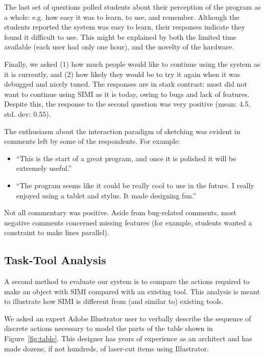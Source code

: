\documentclass{article}
\begin{document}
The last set of questions polled students about their perception of
the program as a whole: e.g. how easy it was to learn, to use, and
remember. Although the students reported the system was easy to learn,
their responses indicate they found it difficult to use. This might be
explained by both the limited time available (each user had only one
hour), and the novelty of the hardware.

Finally, we asked (1) how much people would like to continue using the
system as it is currently, and (2) how likely they would be to try it
again when it was debugged and nicely tuned. The responses are in
stark contrast: most did not want to continue using SIMI as it is
today, owing to bugs and lack of features. Despite this, the response
to the second question was very positive (mean: 4.5, std. dev: 0.55).

The enthusiasm about the interaction paradigm of sketching was evident
in comments left by some of the respondents. For example:

\begin{itemize}
\item ``This is the start of a great program, and once it is polished it
  will be extremely useful.''
\item ``The program seems like it could be really cool to use in the
  future. I really enjoyed using a tablet and stylus. It made
  designing fun.''
\end{itemize}

Not all commentary was positive. Aside from bug-related comments, most
negative comments concerned missing features (for example, students
wanted a constraint to make lines parallel).

\subsection{Task-Tool Analysis}

A second method to evaluate our system is to compare the actions
required to make an object with SIMI compared with an existing
tool. This analysis is meant to illustrate how SIMI is different from
(and similar to) existing tools. 

We asked an expert Adobe Illustrator user to verbally describe the
sequence of discrete actions necessary to model the parts of the table
shown in Figure~\ref{fig:table}. This designer has years of experience
as an architect and has made dozens, if not hundreds, of laser-cut
items using Illustrator.
\end{document}
